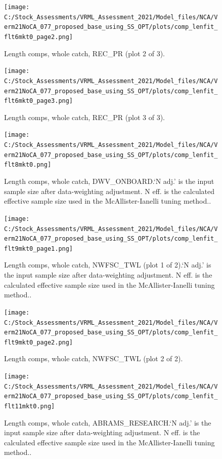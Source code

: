 \documentclass[11pt,
  english,
  a4paper,
]{article}
\begin{document}
\begin{figure}
\centering
\texttt{[image: C:/Stock\_Assessments/VRML\_Assessment\_2021/Model\_files/NCA/Verm21NoCA\_077\_proposed\_base\_using\_SS\_OPT/plots/comp\_lenfit\_flt6mkt0\_page2.png]}
\caption{Length comps, whole catch, REC\_PR (plot 2 of 3).\label{fig:comp_lenfit_flt6mkt0_page2}}
\end{figure}

\begin{figure}
\centering
\texttt{[image: C:/Stock\_Assessments/VRML\_Assessment\_2021/Model\_files/NCA/Verm21NoCA\_077\_proposed\_base\_using\_SS\_OPT/plots/comp\_lenfit\_flt6mkt0\_page3.png]}
\caption{Length comps, whole catch, REC\_PR (plot 3 of 3).\label{fig:comp_lenfit_flt6mkt0_page3}}
\end{figure}

\begin{figure}
\centering
\texttt{[image: C:/Stock\_Assessments/VRML\_Assessment\_2021/Model\_files/NCA/Verm21NoCA\_077\_proposed\_base\_using\_SS\_OPT/plots/comp\_lenfit\_flt8mkt0.png]}
\caption{Length comps, whole catch, DWV\_ONBOARD.`N adj.' is the input sample size after data-weighting adjustment. N eff. is the calculated effective sample size used in the McAllister-Ianelli tuning method..\label{fig:comp_lenfit_flt8mkt0}}
\end{figure}

\begin{figure}
\centering
\texttt{[image: C:/Stock\_Assessments/VRML\_Assessment\_2021/Model\_files/NCA/Verm21NoCA\_077\_proposed\_base\_using\_SS\_OPT/plots/comp\_lenfit\_flt9mkt0\_page1.png]}
\caption{Length comps, whole catch, NWFSC\_TWL (plot 1 of 2).`N adj.' is the input sample size after data-weighting adjustment. N eff. is the calculated effective sample size used in the McAllister-Ianelli tuning method..\label{fig:comp_lenfit_flt9mkt0_page1}}
\end{figure}

\begin{figure}
\centering
\texttt{[image: C:/Stock\_Assessments/VRML\_Assessment\_2021/Model\_files/NCA/Verm21NoCA\_077\_proposed\_base\_using\_SS\_OPT/plots/comp\_lenfit\_flt9mkt0\_page2.png]}
\caption{Length comps, whole catch, NWFSC\_TWL (plot 2 of 2).\label{fig:comp_lenfit_flt9mkt0_page2}}
\end{figure}

\begin{figure}
\centering
\texttt{[image: C:/Stock\_Assessments/VRML\_Assessment\_2021/Model\_files/NCA/Verm21NoCA\_077\_proposed\_base\_using\_SS\_OPT/plots/comp\_lenfit\_flt11mkt0.png]}
\caption{Length comps, whole catch, ABRAMS\_RESEARCH.`N adj.' is the input sample size after data-weighting adjustment. N eff. is the calculated effective sample size used in the McAllister-Ianelli tuning method..\label{fig:comp_lenfit_flt11mkt0}}
\end{figure}
\end{document}

